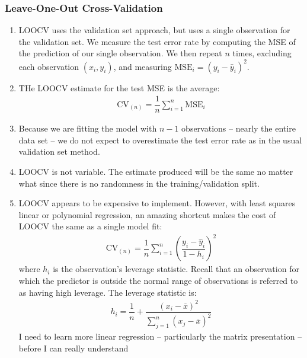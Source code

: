 \documentclass[10pt]{article}
\begin{document}
\subsubsection{Leave-One-Out Cross-Validation} 
\begin{enumerate}
	\item LOOCV uses the validation set approach, but uses a single observation for the validation set.  We measure the test error rate by computing the MSE of the prediction of our single observation.  We then repeat $n$ times, excluding each observation $(x_i,y_i)$, and measuring $\mathrm{MSE}_i = (y_i - \hat y_i)^2$.  
	\item THe LOOCV estimate for the test MSE is the average:
	\begin{align*}
		\mathrm{CV}_{(n)} = \dfrac{1}{n} \sum_{i = 1}^n \mathrm{MSE}_i
	\end{align*}
	\item Because we are fitting the model with $n-1$ observations -- nearly the entire data set -- we do not expect to overestimate the test error rate as in the usual validation set method.
	\item LOOCV is not variable.  The estimate produced will be the same no matter what since there is no randomness in the training/validation split. 
	\item LOOCV appears to be expensive to implement.  However, with least squares linear or polynomial regression, an amazing shortcut makes the cost of LOOCV the same as a single model fit:
	\begin{align*}
		\mathrm{CV}_{(n)} = \dfrac{1}{n} \sum_{i = 1}^n \left(\dfrac{y_i - \hat y_i}{1 - h_i}\right)^2
	\end{align*}
	where $h_i$ is the observation's leverage statistic.  Recall that an observation for which the predictor is outside the normal range of observations is referred to as having high leverage.  The leverage statistic is:
	\begin{align*}
		h_i = \dfrac{1}{n} + \dfrac{(x_i - \overline{x})^2}{\sum_{j = 1}^n (x_j - \overline{x})^2}
	\end{align*}
	{\color{brown} I need to learn more linear regression -- particularly the matrix presentation -- before I can really understand }
\end{enumerate}
\end{document}
